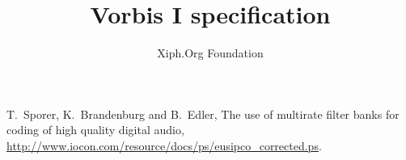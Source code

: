 \documentclass[12pt,paper=a4]{scrartcl}
\renewcommand{\~}{$\sim$}
\begin{document}
\title{Vorbis I specification}
\author{Xiph.Org Foundation}
\maketitle

\tableofcontents












\appendix





 
\begin{thebibliography}{99} 
 
 T.~Sporer, K.~Brandenburg and B.~Edler, 
The use of multirate filter banks for coding of high quality digital audio,
\url{http://www.iocon.com/resource/docs/ps/eusipco_corrected.ps}.


\end{thebibliography}
\end{document}
